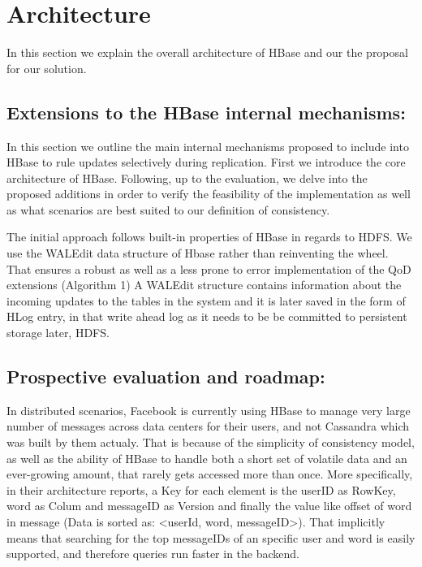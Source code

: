 \chapter{Architecture}
In this section we explain the overall architecture of HBase and our the proposal for our solution.
\label{ch:architecture}

\begin{quotation}
{\small\it}

{\small\it }
\end{quotation}

\section{Extensions to the HBase internal mechanisms:}
In this section we outline the main internal mechanisms proposed to include into HBase to rule updates selectively during replication. First we introduce the core architecture of HBase. Following, up to the evaluation, we delve into the proposed additions in order to verify the feasibility of the implementation as well as what scenarios are best suited to our definition of consistency.

The initial approach follows built-in properties of HBase in regards to HDFS. We use the WALEdit data structure of Hbase rather than reinventing the wheel. That ensures a robust as well as a less prone to error implementation of the QoD extensions (Algorithm 1) A WALEdit structure contains information about the incoming updates to the tables in the system and it is later saved in the form of HLog entry, in that write ahead log as it needs to be be committed to persistent storage later, HDFS.

\section{Prospective evaluation and roadmap:}
In distributed scenarios, Facebook is currently using HBase to manage very large number of messages across data centers for their users, and not Cassandra which was built by them actualy. That is because of the simplicity of consistency model, as well as the ability of HBase to handle both a short set of volatile data and an ever-growing amount, that rarely gets accessed more than once. More specifically, in their architecture reports, a Key for each element is the userID as RowKey, word as Colum and messageID as Version and finally the value like offset of word in message (Data is sorted as: <userId, word, messageID>). That implicitly means that searching for the top messageIDs of an specific user and word is easily supported, and therefore queries run faster in the backend.

